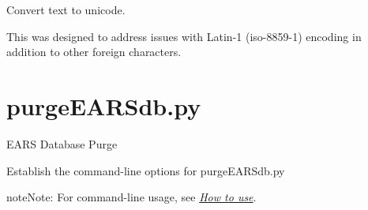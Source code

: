 \documentclass[letterpaper,10pt,english]{sphinxmanual}
\begin{document}
\begin{fulllineitems}
\begin{fulllineitems}
\end{fulllineitems}


\begin{fulllineitems}
\label{codedocs/EARSmilter:EARSmilter.EARSmilter.FileSys.unicodeConvert}
Convert text to unicode.

This was designed to address issues with Latin-1 (iso-8859-1) encoding
in addition to other foreign characters.

\end{fulllineitems}


\end{fulllineitems}



\section{purgeEARSdb.py}
\label{codedocs/purgeEARSdb_py:purgeearsdb-py}\label{codedocs/purgeEARSdb_py::doc}\label{codedocs/purgeEARSdb_py:module-purgeEARSdb}
EARS Database Purge

\begin{fulllineitems}
\label{codedocs/purgeEARSdb_py:purgeEARSdb.purgeEARSdb.Options}
Establish the command-line options for purgeEARSdb.py

\begin{notice}{note}{Note:}
For command-line usage, see {\hyperref[codedocs/purgeEARSdb_py:how-to-use]{\emph{How to use}}}.
\end{notice}

\end{fulllineitems}

\end{document}
